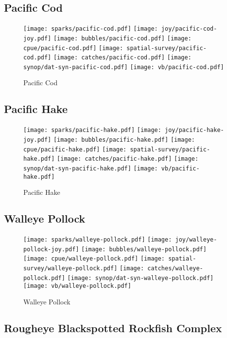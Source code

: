 \subsection*{Pacific Cod}

\begin{figure}[htbp]
\centering
\texttt{[image: sparks/pacific-cod.pdf]}
\texttt{[image: joy/pacific-cod-joy.pdf]}
\texttt{[image: bubbles/pacific-cod.pdf]}
\texttt{[image: cpue/pacific-cod.pdf]}
\texttt{[image: spatial-survey/pacific-cod.pdf]}
\texttt{[image: catches/pacific-cod.pdf]}
\texttt{[image: synop/dat-syn-pacific-cod.pdf]}
\texttt{[image: vb/pacific-cod.pdf]}
\caption{Pacific Cod}
\end{figure}
\clearpage
\subsection*{Pacific Hake}

\begin{figure}[htbp]
\centering
\texttt{[image: sparks/pacific-hake.pdf]}
\texttt{[image: joy/pacific-hake-joy.pdf]}
\texttt{[image: bubbles/pacific-hake.pdf]}
\texttt{[image: cpue/pacific-hake.pdf]}
\texttt{[image: spatial-survey/pacific-hake.pdf]}
\texttt{[image: catches/pacific-hake.pdf]}
\texttt{[image: synop/dat-syn-pacific-hake.pdf]}
\texttt{[image: vb/pacific-hake.pdf]}
\caption{Pacific Hake}
\end{figure}
\clearpage
\subsection*{Walleye Pollock}

\begin{figure}[htbp]
\centering
\texttt{[image: sparks/walleye-pollock.pdf]}
\texttt{[image: joy/walleye-pollock-joy.pdf]}
\texttt{[image: bubbles/walleye-pollock.pdf]}
\texttt{[image: cpue/walleye-pollock.pdf]}
\texttt{[image: spatial-survey/walleye-pollock.pdf]}
\texttt{[image: catches/walleye-pollock.pdf]}
\texttt{[image: synop/dat-syn-walleye-pollock.pdf]}
\texttt{[image: vb/walleye-pollock.pdf]}
\caption{Walleye Pollock}
\end{figure}
\clearpage
\subsection*{Rougheye Blackspotted Rockfish Complex}

